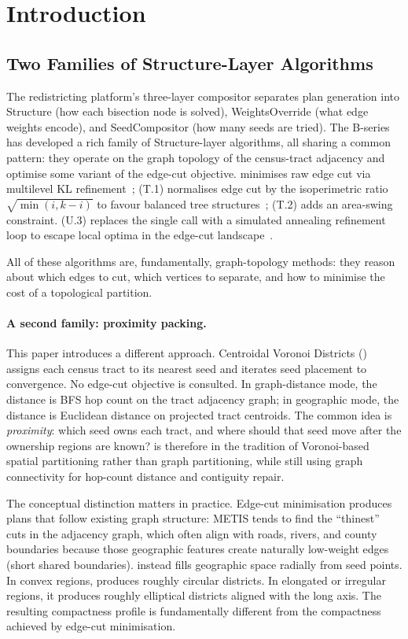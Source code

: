 \section{Introduction}
\label{sec:introduction}

\subsection{Two Families of Structure-Layer Algorithms}

The redistricting platform's three-layer compositor separates plan generation
into Structure (how each bisection node is solved), WeightsOverride (what edge
weights encode), and SeedCompositor (how many seeds are tried).
The B-series has developed a rich family of Structure-layer algorithms,
all sharing a common pattern: they operate on the graph topology of the
census-tract adjacency and optimise some variant of the edge-cut objective.
\metis{} minimises raw edge cut via multilevel KL refinement~\citep{karypis1998};
\geosec{} (T.1) normalises edge cut by the isoperimetric ratio
$\sqrt{\min(i,k-i)}$ to favour balanced tree structures~\citep{b8paper};
\areasec{} (T.2) adds an area-swing constraint.
\sa{} (U.3) replaces the single \metis{} call with a simulated annealing
refinement loop to escape local optima in the edge-cut landscape~\citep{b19paper}.

All of these algorithms are, fundamentally, graph-topology methods: they
reason about which edges to cut, which vertices to separate, and how to
minimise the cost of a topological partition.

\paragraph{A second family: proximity packing.}
This paper introduces a different approach.
Centroidal Voronoi Districts (\cvd{}) assigns each census tract to its nearest
seed and iterates seed placement to convergence.
No edge-cut objective is consulted.
In graph-distance mode, the distance is BFS hop count on the tract adjacency
graph; in geographic mode, the distance is Euclidean distance on projected
tract centroids.
The common idea is \emph{proximity}: which seed owns each tract, and where
should that seed move after the ownership regions are known?
\cvd{} is therefore in the tradition of Voronoi-based spatial partitioning
rather than graph partitioning, while still using graph connectivity for
hop-count distance and contiguity repair.

The conceptual distinction matters in practice.
Edge-cut minimisation produces plans that follow existing graph structure:
METIS tends to find the ``thinest'' cuts in the adjacency graph, which often
align with roads, rivers, and county boundaries because those geographic
features create naturally low-weight edges (short shared boundaries).
\cvd{} instead fills geographic space radially from seed points.
In convex regions, \cvd{} produces roughly circular districts.
In elongated or irregular regions, it produces roughly elliptical districts
aligned with the long axis.
The resulting compactness profile is fundamentally different from the
compactness achieved by edge-cut minimisation.

